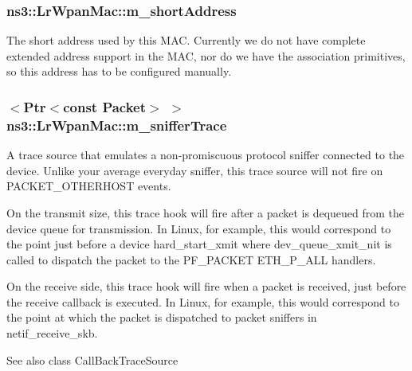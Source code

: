 \subsubsection[{\texorpdfstring{m\+\_\+short\+Address}{m_shortAddress}}]{ ns3\+::\+Lr\+Wpan\+Mac\+::m\+\_\+short\+Address\hspace{0.3cm}{\ttfamily [private]}}\hypertarget{classns3_1_1LrWpanMac_a6886e840ca3a1986b93db966c58ed415}{}\label{classns3_1_1LrWpanMac_a6886e840ca3a1986b93db966c58ed415}
The short address used by this M\+AC. Currently we do not have complete extended address support in the M\+AC, nor do we have the association primitives, so this address has to be configured manually. 
\subsubsection[{\texorpdfstring{m\+\_\+sniffer\+Trace}{m_snifferTrace}}]{$<${\bf Ptr}$<$const {\bf Packet}$>$ $>$ ns3\+::\+Lr\+Wpan\+Mac\+::m\+\_\+sniffer\+Trace\hspace{0.3cm}{\ttfamily [private]}}\hypertarget{classns3_1_1LrWpanMac_a8940ff6f40ddf5d73e5c550cb0317729}{}\label{classns3_1_1LrWpanMac_a8940ff6f40ddf5d73e5c550cb0317729}
A trace source that emulates a non-\/promiscuous protocol sniffer connected to the device. Unlike your average everyday sniffer, this trace source will not fire on P\+A\+C\+K\+E\+T\+\_\+\+O\+T\+H\+E\+R\+H\+O\+ST events.

On the transmit size, this trace hook will fire after a packet is dequeued from the device queue for transmission. In Linux, for example, this would correspond to the point just before a device hard\+\_\+start\+\_\+xmit where dev\+\_\+queue\+\_\+xmit\+\_\+nit is called to dispatch the packet to the P\+F\+\_\+\+P\+A\+C\+K\+ET E\+T\+H\+\_\+\+P\+\_\+\+A\+LL handlers.

On the receive side, this trace hook will fire when a packet is received, just before the receive callback is executed. In Linux, for example, this would correspond to the point at which the packet is dispatched to packet sniffers in netif\+\_\+receive\+\_\+skb.

\begin{DoxySeeAlso}{See also}
class Call\+Back\+Trace\+Source 
\end{DoxySeeAlso}
